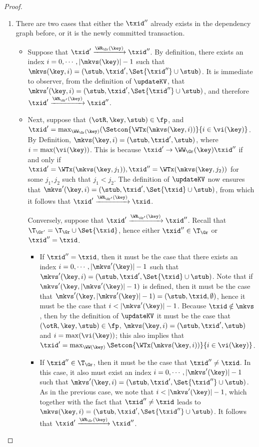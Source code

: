 \begin{proof}
\begin{enumerate}
\item There are two cases that either the \( \txid'' \) already exists in the dependency graph before,
or it is the newly committed transaction.
\begin{itemize}
\item Suppose that $\txid' \xrightarrow{\WR_{\Gr}(\key)} \txid''$. 
By definition, there exists an index $i = 0,\cdots, \lvert \mkvs(\key) \rvert - 1$ 
such that $\mkvs(\key, i) = (\stub, \txid', \Set{\txid''} \cup \stub)$. It is immediate 
to observer, from the definition of $\updateKV$, that $\mkvs'(\key, i) = (\stub, \txid', \Set{\txid''} \cup \stub)$, 
and therefore $\txid' \xrightarrow{\WR_{\Gr'}(\key)} \txid''$. 

\item Next, suppose that $(\otR, \key, \stub) \in \fp$, and $\txid' = \max_{\WW_{\Gr}(\key)}(\Setcon{\WTx(\mkvs(\key, i)) }{ i \in \vi(\key)}$. 
By Definition, $\mkvs(\key, i) = (\stub, \txid', \stub)$, where $i = \max(\vi(\key))$. This is because 
$\txid' \rightarrow{\WW_{\Gr}(\key)} \txid''$ if and only if $\txid' = \WTx(\mkvs(\key, j_1)), \txid'' = 
\WTx(\mkvs(\key, j_2))$ for some $j_1, j_2$ such that $j_1 < j_2$. 
The definition of $\updateKV$ now ensures that $\mkvs'(\key, i) = (\stub, \txid', \Set{\txid } \cup \stub)$, 
from which it follows that $\txid' \xrightarrow{\WR_{\Gr'}(\key)} \txid$.

Conversely, suppose that $\txid' \xrightarrow{\WR_{\Gr'}(\key)} \txid''$. 
Recall that $\T_{\Gr'} = \T_{\Gr} \cup \Set{ \txid }$, hence either 
$\txid'' \in \T_{\Gr}$ or $\txid'' = \txid$. 

\begin{itemize}
\item If $\txid'' = \txid$, then it must be the case that there exists an index $i = 0,\cdots, \lvert \mkvs'(\key) \rvert - 1$ 
such that $\mkvs'(\key, i) = (\stub, \txid', \Set{\txid } \cup \stub)$. Note that if $\mkvs'(\key, \lvert \mkvs'(\key) \rvert -1)$ is 
defined, then it must be the case that $\mkvs'(\key, \lvert \mkvs'(\key) \rvert -1) = (\stub, \txid, \emptyset)$, 
hence it must be the case that $i < \lvert \mkvs'(\key) \rvert - 1$. Because $\txid \notin \mkvs$, 
then by the definition of $\updateKV$ it must be the case that $(\otR, \key, \stub) \in \fp$, 
$\mkvs(\key, i) = (\stub, \txid', \stub)$ and $i = \max(\vi(\key))$; this also implies that $\txid' = 
\max_{\WW(\key)}\Setcon{\WTx(\mkvs(\key, i)) }{ i \in \vi(\key)}$. 

\item If $\txid'' \in \T_{\Gr}$, then  it must be the case that $\txid'' \neq \txid$. 
In this case, it also must exist an index $i = 0,\cdots, \lvert \mkvs'(\key) \rvert - 1$ 
such that $\mkvs'(\key, i) = (\stub, \txid', \Set{\txid''} \cup \stub)$. As in the previous 
case, we note that $i < \lvert \mkvs'(\key) \rvert - 1$, which together 
with the fact that $\txid'' \neq \txid$ leads to $\mkvs(\key, i) = (\stub, \txid', \Set{\txid''} \cup \stub)$. 
It follows that $\txid' \xrightarrow{\WR_{\Gr}(\key)} \txid''$.
\end{itemize}
\end{itemize}


\end{enumerate}
\end{proof}
